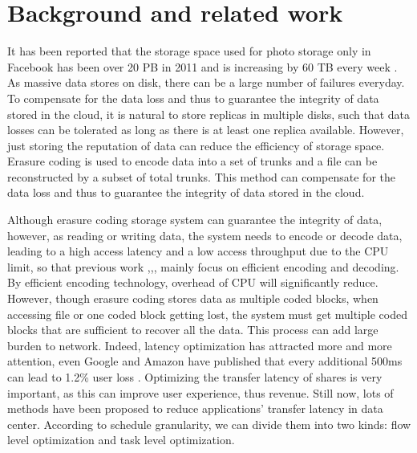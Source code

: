 \documentclass{IEEEtran}
\begin{document}
\section{Background and related work} \label{Background}

It has been reported that the storage space used for photo storage only in Facebook 
has been over 20 PB in 2011 and is increasing by 60 TB every week \cite{beaver2010finding} \cite{li2013erasure}.
As massive data stores on disk, there can be a large number of failures everyday.
To compensate for the data loss and thus to guarantee the integrity of data stored in the cloud, 
it is natural to store replicas in multiple disks, such that data losses can be tolerated as long as there is at least one replica available\cite{li2013erasure}.
However, just storing the reputation of data can reduce the efficiency of storage space.
Erasure coding is used to encode data into a set of trunks and a file can be reconstructed by a subset of total trunks.
This method can compensate for the data loss and thus to guarantee the integrity of data stored in the cloud.

Although erasure coding storage system can guarantee the integrity of data, however,
as reading or writing data, the system needs to encode or decode data,
 leading to a high access latency and a low access throughput due to the CPU limit,
 so that previous work  \cite{lin2012secure},\cite{dimakis2010network},\cite{dimakis2006decentralized},\cite{dimakis606049decentralized} mainly focus on
 efficient encoding and decoding.
 By efficient encoding technology,  overhead of CPU will significantly reduce.
 However, though erasure coding stores data as multiple coded blocks, 
 when accessing file or one coded block getting lost, 
 the system must get multiple coded blocks that are sufficient to recover all the data.
 This process can add large burden to network.
Indeed, latency optimization has attracted more and more attention, even Google and Amazon have published that every additional 500ms can
lead to 1.2\% user loss \cite{schurman2009user}. 
Optimizing the transfer latency of shares is very important, as this can improve user experience, thus revenue.
Still now, lots of methods have been proposed to reduce applications' transfer latency in data center.
According to schedule granularity, we can divide them into two kinds: flow level optimization and task level optimization.
\end{document}
